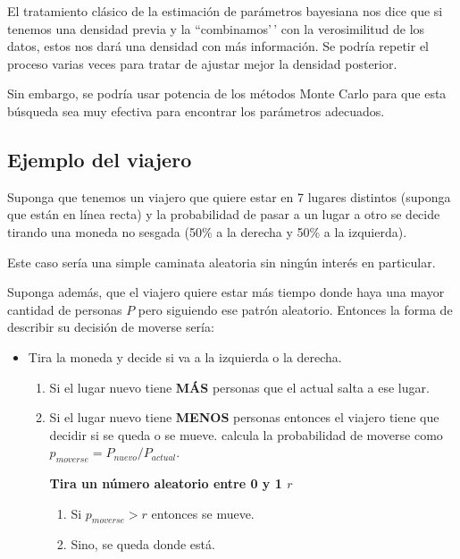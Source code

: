 \documentclass[
  12pt,
]{book}
\providecommand{\tightlist}{%
  \setlength{\itemsep}{0pt}\setlength{\parskip}{0pt}}
\theoremstyle{definition}
\theoremstyle{definition}
\theoremstyle{definition}
\theoremstyle{remark}
\begin{document}
El tratamiento clásico de la estimación de parámetros bayesiana nos dice que si tenemos una densidad previa y la ``combinamos'\,' con la verosimilitud de los datos, estos nos dará una densidad con más información. Se podría repetir el proceso varias veces para tratar de ajustar mejor la densidad posterior.

Sin embargo, se podría usar potencia de los métodos Monte Carlo para que esta búsqueda sea muy efectiva para encontrar los parámetros adecuados.

\hypertarget{ejemplo-del-viajero}{%
\subsection{Ejemplo del viajero}\label{ejemplo-del-viajero}}

Suponga que tenemos un viajero que quiere estar en 7 lugares distintos (suponga que están en línea recta) y la probabilidad de pasar a un lugar a otro se decide tirando una moneda no sesgada (50\% a la derecha y 50\% a la izquierda).

Este caso sería una simple caminata aleatoria sin ningún interés en particular.

Suponga además, que el viajero quiere estar más tiempo donde haya una mayor cantidad de personas \(P\) pero siguiendo ese patrón aleatorio. Entonces la forma de describir su decisión de moverse sería:

\begin{itemize}
\tightlist
\item
  Tira la moneda y decide si va a la izquierda o la derecha.

  \begin{enumerate}
  \def\labelenumi{\arabic{enumi}.}
  \item
    Si el lugar nuevo tiene \textbf{MÁS} personas que el actual salta a ese lugar.
  \item
    Si el lugar nuevo tiene \textbf{MENOS} personas entonces el viajero tiene que decidir si se queda o se mueve. \textbar{} calcula la probabilidad de moverse como \(p_{moverse} = P_{nuevo}/P_{actual}\).

    \textbf{Tira un número aleatorio entre 0 y 1 \(r\)}

    \begin{enumerate}
    \def\labelenumii{\arabic{enumii}.}
    \tightlist
    \item
      Si \(p_{moverse}>r\) entonces se mueve.
    \item
      Sino, se queda donde está.
    \end{enumerate}
  \end{enumerate}
\end{itemize}
\end{document}
